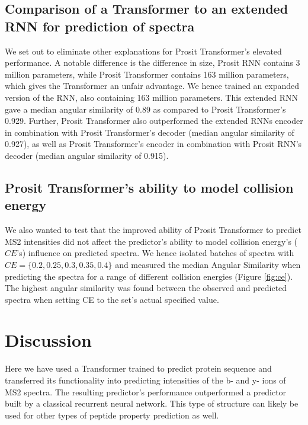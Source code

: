 \documentclass[10pt,a4paper]{article}
\begin{document}
\subsection*{Comparison of a Transformer to an extended RNN for prediction of spectra}

We set out to eliminate other explanations for Prosit Transformer's elevated performance. A notable difference is the difference in size, Prosit RNN contains 3 million parameters, while Prosit Transformer contains 163 million parameters, which gives the Transformer an unfair advantage. We hence trained an expanded version of the RNN, also containing 163 million parameters. This extended RNN gave a median angular similarity of 0.89  as compared to Prosit Transformer's 0.929. Further, Prosit Transformer also outperformed the extended RNNs encoder in combination with Prosit Transformer’s decoder (median angular similarity of 0.927), as well as Prosit Transformer's encoder in combination with Prosit RNN's decoder (median angular similarity of 0.915). 


\subsection*{Prosit Transformer’s ability to model collision energy}

    
We also wanted to test that the improved ability of Prosit Transformer to predict MS2 intensities did not affect the predictor’s ability to model collision energy’s ($\textit{CE}$’s) influence on predicted spectra. We hence isolated batches of spectra with $\textit{CE}=\{0.2, 0.25, 0.3, 0.35, 0.4\}$ and measured the median Angular Similarity when predicting the spectra for a range of different collision energies (Figure \ref{fig:ce}). The highest angular similarity was found between the observed and predicted spectra when setting CE to the set’s actual specified value.

\section*{Discussion}
Here we have used a Transformer trained to predict protein sequence and transferred its functionality into predicting intensities of the b- and y- ions of MS2 spectra. The resulting predictor’s performance outperformed a predictor built by a classical recurrent neural network. This type of structure can likely be used for other types of peptide property prediction as well.
\end{document}
